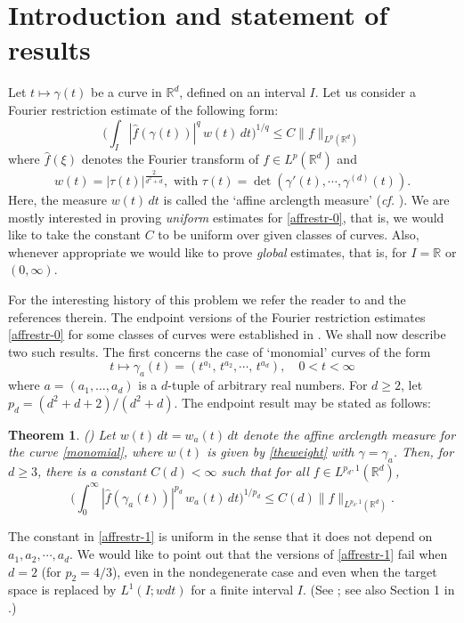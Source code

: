 \documentclass[11 pt]{amsart}
\theoremstyle{plain}
\newtheorem{theorem}{Theorem}[section]
\numberwithin{equation}{section}
\theoremstyle{plain}
\numberwithin{equation}{section}
\theoremstyle{remark}
\begin{document}
\section{Introduction and statement of results}
\label{intro}
Let $t\mapsto \gamma(t)$ be a curve in ${{\mathbb {R}}}^d$, defined on an interval $I$.
Let us consider a Fourier restriction estimate of the following form:
\begin{equation} \label{affrestr-0}
\Big(\int_I
 |\widehat f (\gamma (t))|^{q} \, w(t)\, dt\Big)^{1/q} \le
C \|f\|_{L^{p}({{\mathbb {R}}}^d)}
\end{equation}
where
$\widehat f (\xi)$ denotes the Fourier transform of $f \in L^p({{\mathbb {R}}}^d)$ and
\begin{equation} \label{theweight}
 w (t) = |\tau(t)|^{\frac{2}{d^2+d}}, \text{ with } \tau(t) = \det(\gamma'(t), \cdots,
\gamma^{(d)}(t)) .
\end{equation}
Here, the measure $w(t)\, dt$ is called the `affine arclength measure' ({\it cf.} \cite{DM1,DM2,BOS1}). We are mostly interested in proving {\it uniform} estimates for \eqref{affrestr-0}, that is, we would like to take the constant $C$ to be uniform over given classes of curves. Also, whenever appropriate we would like to prove {\it global} estimates, that is, for $I = {{\mathbb {R}}}$ or $(0,\infty)$.

For the interesting history of this problem we refer the reader to \cite{D2, BOS1, BOS3} and the references therein.
The endpoint versions of the Fourier restriction estimates \eqref{affrestr-0} for some
classes of curves were established in \cite{BOS3}. We shall now describe two
such results. The first concerns the case of `monomial' curves
of the form
\begin{equation}\label{monomial}
t\mapsto \gamma_a(t)=(t^{a_1},\, t^{a_2},\cdots,\, t^{a_d}), \quad
0<t<\infty
\end{equation}
where $a=(a_1,\dots, a_d)$ is a $d$-tuple of arbitrary real numbers. For $d\ge 2$, let $p_d = (d^2+d+2)/(d^2+d)$.
The endpoint result
may be stated as follows:

\begin{theorem}{\rm (\cite{BOS3})} \label{powerthm} Let $w(t)\, dt = w_a(t)\, dt$ denote the affine arclength measure for the curve \eqref{monomial}, where $w (t)$ is given by \eqref{theweight} with $\gamma = \gamma_a$.
Then, for $d\ge 3$, there is a constant $C(d)<\infty$ such that for all
$f\in L^{p_d ,1}({{\mathbb {R}}}^d)$,
\begin{equation} \label{affrestr-1}
\Big(\int_0^\infty
 |\widehat f (\gamma_a(t))|^{p_d} \, w_a(t) \, dt\Big)^{1/p_d} \le
C(d)\|f\|_{L^{p_d ,1}({{\mathbb {R}}}^d)}.
\end{equation}
\end{theorem}
The constant in \eqref{affrestr-1} is uniform in the sense that
it does not depend on $a_1, a_2, \cdots, a_d$. We would like to point out that the versions of \eqref{affrestr-1} fail when $d=2$ (for $p_2 = 4/3$), even in the nondegenerate case and even when the target space is replaced by $L^1(I; wdt)$ for a finite interval $I$. (See \cite{bcss}; see also Section 1 in \cite{BOS1}.)
\end{document}
